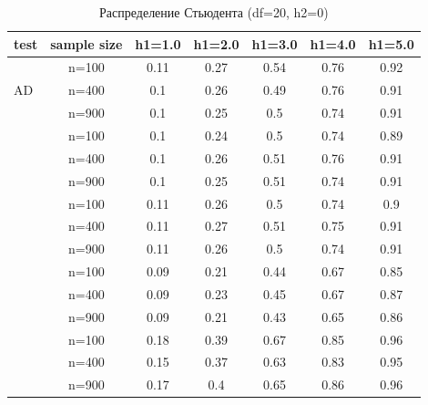 \documentclass[12pt]{article}
\theoremstyle{break}
\begin{document}
\begin{table}[!h]
	\centering
	\caption{Распределение Стьюдента (df=20, h2=0)}
	\begin{tabular}{l c c c c c c} 
		\toprule
		test & sample size & h1=1.0 & h1=2.0 & h1=3.0 & h1=4.0 & h1=5.0 \\ 
		\midrule
		\multirow{3}{*}{AD} 
		& n=100 & 0.11 & 0.27 & 0.54 & 0.76 & 0.92 \\ 
		& n=400 & 0.1 & 0.26 & 0.49 & 0.76 & 0.91 \\ 
		& n=900 & 0.1 & 0.25 & 0.5 & 0.74 & 0.91 \\ 
		\addlinespace
		\addlinespace
		\multirow{3}{*}{CM} 
		& n=100 & 0.1 & 0.24 & 0.5 & 0.74 & 0.89 \\ 
		& n=400 & 0.1 & 0.26 & 0.51 & 0.76 & 0.91 \\ 
		& n=900 & 0.1 & 0.25 & 0.51 & 0.74 & 0.91 \\ 
		\addlinespace
		\addlinespace
		\multirow{3}{*}{ET} 
		& n=100 & 0.11 & 0.26 & 0.5 & 0.74 & 0.9 \\ 
		& n=400 & 0.11 & 0.27 & 0.51 & 0.75 & 0.91 \\ 
		& n=900 & 0.11 & 0.26 & 0.5 & 0.74 & 0.91 \\ 
		\addlinespace
		\addlinespace
		\multirow{3}{*}{KS} 
		& n=100 & 0.09 & 0.21 & 0.44 & 0.67 & 0.85 \\ 
		& n=400 & 0.09 & 0.23 & 0.45 & 0.67 & 0.87 \\ 
		& n=900 & 0.09 & 0.21 & 0.43 & 0.65 & 0.86 \\ 
		\addlinespace
		\addlinespace
		\multirow{3}{*}{WMW} 
		& n=100 & 0.18 & 0.39 & 0.67 & 0.85 & 0.96 \\ 
		& n=400 & 0.15 & 0.37 & 0.63 & 0.83 & 0.95 \\ 
		& n=900 & 0.17 & 0.4 & 0.65 & 0.86 & 0.96 \\ 
		\bottomrule
	\end{tabular}
	\label{tbl:student20_pow_vs_h1}
\end{table}
\end{document}
